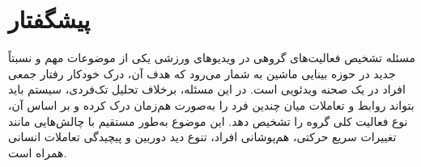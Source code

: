 \documentclass[12pt]{report}
\begin{document}
%




\chapter*{پیشگفتار}

مسئله تشخیص فعالیت‌های گروهی در ویدیوهای ورزشی یکی از موضوعات مهم و نسبتاً جدید در حوزه بینایی ماشین به شمار می‌رود که هدف آن، درک خودکار رفتار جمعی افراد در یک صحنه ویدئویی است. در این مسئله، برخلاف تحلیل تک‌فردی، سیستم باید بتواند روابط و تعاملات میان چندین فرد را به‌صورت هم‌زمان درک کرده و بر اساس آن، نوع فعالیت کلی گروه را تشخیص دهد. این موضوع به‌طور مستقیم با چالش‌هایی مانند تغییرات سریع حرکتی، هم‌پوشانی افراد، تنوع دید دوربین و پیچیدگی تعاملات انسانی همراه است.
\end{document}
